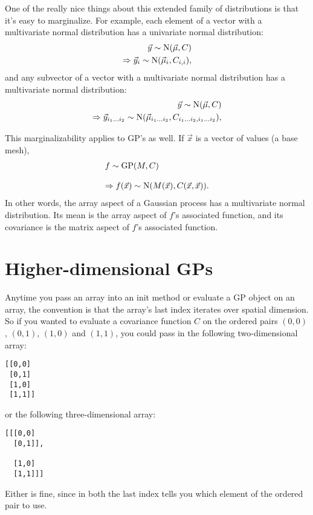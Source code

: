 \documentclass{manual}
\begin{document}
One of the really nice things about this extended family of distributions is that it's easy to marginalize. For example, each element of a vector with a multivariate normal distribution has a univariate normal distribution:
\begin{eqnarray*}
    \vec y\sim\textup N(\vec \mu,C)\\
	\Rightarrow \vec y_i\sim\textup N(\vec \mu_i,C_{i,i}),
\end{eqnarray*}
and any subvector of a vector with a multivariate normal distribution has a multivariate normal distribution:
\begin{eqnarray*}
    \vec y\sim\textup N(\vec \mu,C)\\
	\Rightarrow \vec y_{i_1\ldots i_2}\sim\textup N(\vec \mu_{i_1\ldots i_2},C_{i_1\ldots i_2,i_1\ldots i_2}),
\end{eqnarray*}

This marginalizability applies to GP's as well. If $\vec x$ is a vector of values (a base mesh),
\begin{equation}
	\begin{array}{l}
		f\sim\textup{GP}(M, C)\\\\
		\Rightarrow f(\vec x) \sim\textup N(M(\vec x), C(\vec x,\vec x)).
	\end{array}
\end{equation}
In other words, the array aspect of a Gaussian process  has a multivariate normal distribution. Its mean is the array aspect of $f$'s associated  function, and its covariance is the matrix aspect of $f$'s associated  function. 

\section{Higher-dimensional GPs}\label{sec:highdim} %
Anytime you pass an array into an init method or evaluate a GP object on an array, the convention is that the array's last index iterates over spatial dimension. So if you wanted to evaluate a covariance function $C$ on the ordered pairs $(0,0)$, $(0,1)$, $(1,0)$ and $(1,1)$, you could pass in the following two-dimensional array:
\begin{verbatim}
[[0,0]
 [0,1]
 [1,0]
 [1,1]]
\end{verbatim}
or the following three-dimensional array:
\begin{verbatim}
[[[0,0]
  [0,1]],

  [1,0]
  [1,1]]]
\end{verbatim}
Either is fine, since in both the last index tells you which element of the ordered pair to use.
\end{document}
